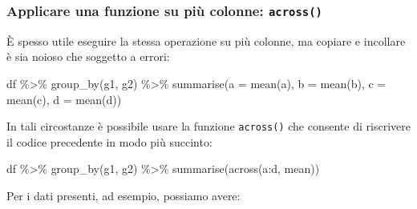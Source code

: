 \documentclass[
  10pt,
  italian,
  a4paper,
  extrafontsizes,onecolumn,openright
  ]{memoir}
\newenvironment{Shaded}{\begin{snugshade}}{\end{snugshade}}
\newcommand{\AttributeTok}[1]{\textcolor[rgb]{0.77,0.63,0.00}{#1}}
\newcommand{\FunctionTok}[1]{\textcolor[rgb]{0.00,0.00,0.00}{#1}}
\newcommand{\NormalTok}[1]{#1}
\newcommand{\SpecialCharTok}[1]{\textcolor[rgb]{0.00,0.00,0.00}{#1}}
\begin{document}
\hypertarget{applicare-una-funzione-su-piuxf9-colonne-across}{%
\subsubsection{\texorpdfstring{Applicare una funzione su più colonne: \texttt{across()}}{Applicare una funzione su più colonne: across()}}\label{applicare-una-funzione-su-piuxf9-colonne-across}}

È spesso utile eseguire la stessa operazione su più colonne, ma copiare e incollare è sia noioso che soggetto a errori:

\begin{Shaded}
\begin{Highlighting}[]
\NormalTok{df }\SpecialCharTok{\%\textgreater{}\%} 
  \FunctionTok{group\_by}\NormalTok{(g1, g2) }\SpecialCharTok{\%\textgreater{}\%} 
  \FunctionTok{summarise}\NormalTok{(}\AttributeTok{a =} \FunctionTok{mean}\NormalTok{(a), }\AttributeTok{b =} \FunctionTok{mean}\NormalTok{(b), }\AttributeTok{c =} \FunctionTok{mean}\NormalTok{(c), }\AttributeTok{d =} \FunctionTok{mean}\NormalTok{(d))}
\end{Highlighting}
\end{Shaded}

\noindent
In tali circostanze è possibile usare la funzione \texttt{across()} che consente di riscrivere il codice precedente in modo più succinto:

\begin{Shaded}
\begin{Highlighting}[]
\NormalTok{df }\SpecialCharTok{\%\textgreater{}\%} 
  \FunctionTok{group\_by}\NormalTok{(g1, g2) }\SpecialCharTok{\%\textgreater{}\%} 
  \FunctionTok{summarise}\NormalTok{(}\FunctionTok{across}\NormalTok{(a}\SpecialCharTok{:}\NormalTok{d, mean))}
\end{Highlighting}
\end{Shaded}

\noindent
Per i dati presenti, ad esempio, possiamo avere:
\end{document}
